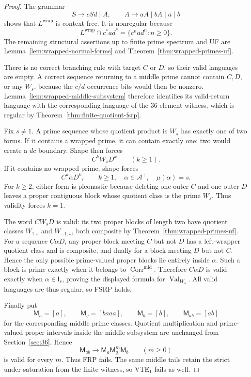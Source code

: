 \documentclass[11pt,a4paper]{article}
\newcommand{\Val}{\operatorname{Val}}
\newcommand{\Corr}{\operatorname{Corr}}
\begin{document}
\begin{proof}
The grammar
\[
  S\to cSd\mid A,
  \qquad
  A\to aA\mid bA\mid a\mid b
\]
shows that $L^{\mathrm{wrap}}$ is context-free.  It is nonregular because
\[
  L^{\mathrm{wrap}}\cap c^*ad^*
  =\{c^nad^n:n\ge0\}.
\]
The remaining structural assertions up to finite prime spectrum and UF are
Lemma~\ref{lem:wrapped-normal-forms} and
Theorem~\ref{thm:wrapped-primes-uf}.

There is no correct branching rule with target $C$ or $D$, so their valid
languages are empty.  A correct sequence returning to a middle prime cannot contain $C,D$, or any $W_s$, because the $c/d$ occurrence bits would then be nonzero.  Lemma~\ref{lem:wrapped-middle-subsystem} therefore identifies its valid-return language with the corresponding language of the $36$-element witness, which is regular by Theorem~\ref{thm:finite-quotient-fsrp}.

Fix $s\ne1$.  A prime sequence whose quotient product is $W_s$ has exactly
one of two forms.  If it contains a wrapped prime, it can contain exactly one:
two would create a $dc$ boundary.  Shape then forces
\[
  C^kW_sD^k\qquad(k\ge1).
\]
If it contains no wrapped prime, shape forces
\[
  C^k\alpha D^k,
  \qquad
  k\ge1,
  \quad
  \alpha\in\mathcal A^+,
  \quad
  \mu(\alpha)=s.
\]
For $k\ge2$, either form is pleonastic because deleting one outer $C$ and one
outer $D$ leaves a proper contiguous block whose quotient class is the prime
$W_s$.  Thus validity forces $k=1$.

The word $CW_sD$ is valid: its two proper blocks of length two have quotient
classes $W_{1,s}$ and $W_{-1,s}$, both composite by
Theorem~\ref{thm:wrapped-primes-uf}.  For a sequence $C\alpha D$, any proper
block meeting $C$ but not $D$ has a left-wrapper quotient class and is
composite, and dually for a block meeting $D$ but not $C$.  Hence the only
possible prime-valued proper blocks lie entirely inside $\alpha$.  Such a
block is prime exactly when it belongs to $\Corr^{\mathrm{mid}}$.  Therefore
$C\alpha D$ is valid exactly when $\alpha\in\mathsf I_s$, proving the
displayed formula for $\Val_{W_s}$.  All valid languages are thus regular, so
FSRP holds.

Finally put
\[
  \mathsf M_a=[a],\qquad
  \mathsf M_q=[baaa],\qquad
  \mathsf M_b=[b],\qquad
  \mathsf M_{ab}=[ab]
\]
for the corresponding middle prime classes.  Quotient multiplication and
prime-valued proper intervals inside the middle subsystem are unchanged from
Section~\ref{sec:36}.  Hence
\[
  \mathsf M_{ab}
  \to
  \mathsf M_a\mathsf M_q^m\mathsf M_b
  \qquad(m\ge0)
\]
is valid for every $m$.  Thus FRP fails.  The same middle tails retain the
strict under-saturation from the finite witness, so VTE$_1$ fails as well.
\end{proof}
\end{document}
